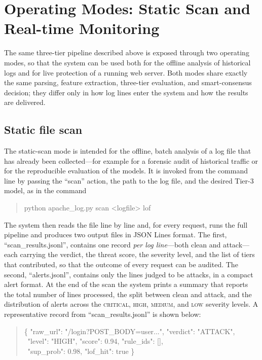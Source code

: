 \documentclass[12pt,a4paper]{report}
\begin{document}
\section{Operating Modes: Static Scan and Real-time Monitoring}
\label{sec:modes}

The same three-tier pipeline described above is exposed through two
operating modes, so that the system can be used both for the offline
analysis of historical logs and for live protection of a running web server.
Both modes share exactly the same parsing, feature extraction, three-tier
evaluation, and smart-consensus decision; they differ only in how log lines
enter the system and how the results are delivered.

\subsection{Static file scan}

The static-scan mode is intended for the offline, batch analysis of a log
file that has already been collected---for example for a forensic audit of
historical traffic or for the reproducible evaluation of the models. It is
invoked from the command line by passing the ``scan'' action, the path
to the log file, and the desired Tier-3 model, as in the command
\begin{quote}\small\ttfamily
python apache\_log.py scan <logfile> lof
\end{quote}
The system then reads the
file line by line and, for every request, runs the full pipeline and produces
two output files in JSON Lines format. The first, ``scan\_results.jsonl'',
contains one record \emph{per log line}---both clean and attack---each
carrying the verdict, the threat score, the severity level, and the list of
tiers that contributed, so that the outcome of every request can be audited.
The second, ``alerts.jsonl'', contains only the lines judged to be
attacks, in a compact alert format. At the end of the scan the system prints
a summary that reports the total number of lines processed, the split between
clean and attack, and the distribution of alerts across the
\textsc{critical}, \textsc{high}, \textsc{medium}, and \textsc{low} severity
levels. A representative record from ``scan\_results.jsonl'' is shown
below:

\begin{quote}\small\ttfamily
\{ "raw\_url": "/login?POST\_BODY=user...", "verdict": "ATTACK",\\
\ "level": "HIGH", "score": 0.94, "rule\_ids": [], \\
\ "sup\_prob": 0.98, "lof\_hit": true \}
\end{quote}
\end{document}
